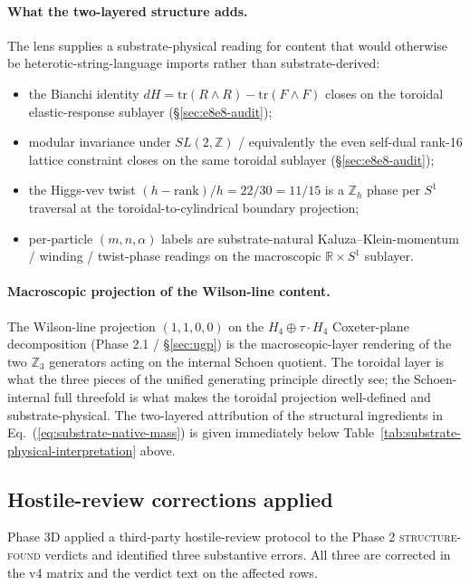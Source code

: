 ﻿\documentclass[reprint,amsmath,amssymb,aps,prd,longbibliography,floatfix]{revtex4-2}
\begin{document}
\paragraph{What the two-layered structure adds.} The lens supplies
a substrate-physical reading for content that would otherwise be
heterotic-string-language imports rather than substrate-derived:
\begin{itemize}
\item the Bianchi identity
$dH = \mathrm{tr}(R \wedge R) - \mathrm{tr}(F \wedge F)$ closes on
the toroidal elastic-response sublayer (\S\ref{sec:e8e8-audit});
\item modular invariance under $SL(2, \mathbb{Z})$ / equivalently
the even self-dual rank-16 lattice constraint closes on the same
toroidal sublayer (\S\ref{sec:e8e8-audit});
\item the Higgs-vev twist $(h - \mathrm{rank})/h = 22/30 = 11/15$
is a $\mathbb{Z}_h$ phase per $S^1$ traversal at the
toroidal-to-cylindrical boundary projection;
\item per-particle $(m, n, \alpha)$ labels are
substrate-natural Kaluza--Klein-momentum / winding / twist-phase
readings on the macroscopic $\mathbb{R} \times S^1$ sublayer.
\end{itemize}

\paragraph{Macroscopic projection of the Wilson-line content.}
The Wilson-line projection $(1, 1, 0, 0)$ on the
$H_4 \oplus \tau \cdot H_4$ Coxeter-plane decomposition
(Phase 2.1 / \S\ref{sec:ugp}) is the macroscopic-layer rendering
of the two $\mathbb{Z}_3$ generators acting on the
internal Schoen quotient. The toroidal layer is what the three
pieces of the unified generating principle directly see; the
Schoen-internal full threefold is what makes the toroidal
projection well-defined and substrate-physical. The two-layered
attribution of the structural ingredients in
Eq.~(\ref{eq:substrate-native-mass}) is given immediately below
Table~\ref{tab:substrate-physical-interpretation} above.

\subsection{Hostile-review corrections applied}
\label{sec:hostile-review-corrections}

Phase 3D applied a third-party hostile-review protocol to the Phase 2
\textsc{structure-found} verdicts and identified three substantive
errors. All three are corrected in the v4 matrix and the verdict
text on the affected rows.
\end{document}
